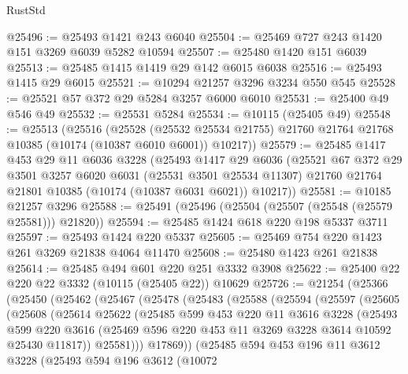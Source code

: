 \begin{lexlean}{RustStd}
\begin{coremodule}
@25496 := @25493 @1421 @243 @6040
@25504 := @25469 @727 @243 @1420 @151 @3269 @6039 @5282 @10594
@25507 := @25480 @1420 @151 @6039
@25513 := @25485 @1415 @1419 @29 @142 @6015 @6038
@25516 := @25493 @1415 @29 @6015
@25521 := @10294 @21257 @3296 @3234 @550 @545
@25528 := @25521 @57 @372 @29 @5284 @3257 @6000 @6010
@25531 := @25400 @49 @546 @49
@25532 := @25531 @5284
@25534 := @10115 (@25405 @49)
@25548 := @25513
    (@25516
      (@25528
        (@25532 @25534 @21755)
        @21760
        @21764
        @21768
        @10385
        (@10174 (@10387 @6010 @6001))
        @10217))
@25579 := @25485
    @1417
    @453
    @29
    @11
    @6036
    @3228
    (@25493
      @1417
      @29
      @6036
      (@25521
        @67
        @372
        @29
        @3501
        @3257
        @6020
        @6031
        (@25531 @3501 @25534 @11307)
        @21760
        @21764
        @21801
        @10385
        (@10174 (@10387 @6031 @6021))
        @10217))
@25581 := @10185 @21257 @3296
@25588 := @25491 (@25496 (@25504 (@25507 (@25548 (@25579 @25581))) @21820))
@25594 := @25485 @1424 @618 @220 @198 @5337 @3711
@25597 := @25493 @1424 @220 @5337
@25605 := @25469 @754 @220 @1423 @261 @3269 @21838 @4064 @11470
@25608 := @25480 @1423 @261 @21838
@25614 := @25485 @494 @601 @220 @251 @3332 @3908
@25622 := @25400 @22 @220 @22 @3332 (@10115 (@25405 @22)) @10629
@25726 := @21254
    (@25366
      (@25450
        (@25462
          (@25467
            (@25478
              (@25483
                (@25588
                  (@25594
                    (@25597
                      (@25605
                        (@25608
                          (@25614
                            @25622
                            (@25485
                              @599
                              @453
                              @220
                              @11
                              @3616
                              @3228
                              (@25493
                                @599
                                @220
                                @3616
                                (@25469 @596 @220 @453 @11 @3269 @3228 @3614 @10592 @25430 @11817))
                              @25581)))
                        @17869))
                    (@25485
                      @594
                      @453
                      @196
                      @11
                      @3612
                      @3228
                      (@25493
                        @594
                        @196
                        @3612
                        (@10072

\end{coremodule}
\end{lexlean}
